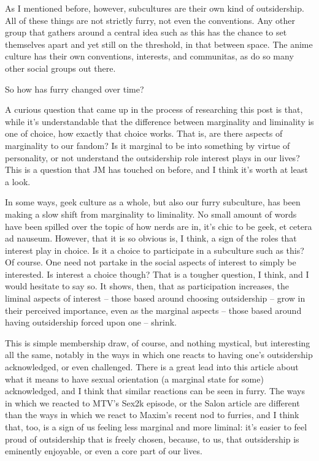 As I mentioned before, however, subcultures are their own kind of outsidership. All of these things are not strictly furry, not even the conventions. Any other group that gathers around a central idea such as this has the chance to set themselves apart and yet still on the threshold, in that between space. The anime culture has their own conventions, interests, and communitas, as do so many other social groups out there.

So how has furry changed over time?

A curious question that came up in the process of researching this post is that, while it's understandable that the difference between marginality and liminality is one of choice, how exactly that choice works. That is, are there aspects of marginality to our fandom? Is it marginal to be into something by virtue of personality, or not understand the outsidership role interest plays in our lives? This is a question that JM has touched on before, and I think it's worth at least a look.

In some ways, geek culture as a whole, but also our furry subculture, has been making a slow shift from marginality to liminality. No small amount of words have been spilled over the topic of how nerds are in, it's chic to be geek, et cetera ad nauseum. However, that it is so obvious is, I think, a sign of the roles that interest play in choice. Is it a choice to participate in a subculture such as this? Of course. One need not partake in the social aspects of interest to simply be interested. Is interest a choice though? That is a tougher question, I think, and I would hesitate to say so. It shows, then, that as participation increases, the liminal aspects of interest -- those based around choosing outsidership -- grow in their perceived importance, even as the marginal aspects -- those based around having outsidership forced upon one -- shrink.

This is simple membership draw, of course, and nothing mystical, but interesting all the same, notably in the ways in which one reacts to having one's outsidership acknowledged, or even challenged. There is a great lead into this article about what it means to have sexual orientation (a marginal state for some) acknowledged, and I think that similar reactions can be seen in furry. The ways in which we reacted to MTV's Sex2k episode, or the Salon article are different than the ways in which we react to Maxim's recent nod to furries, and I think that, too, is a sign of us feeling less marginal and more liminal: it's easier to feel proud of outsidership that is freely chosen, because, to us, that outsidership is eminently enjoyable, or even a core part of our lives.

